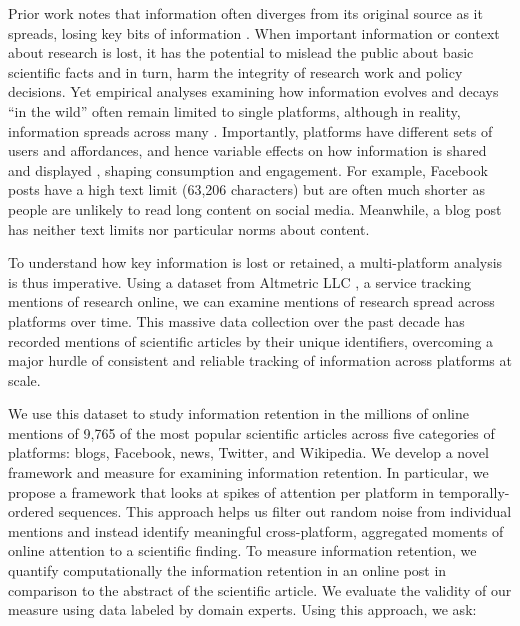 \documentclass[letterpaper]{article} %
\begin{document}
Prior work notes that information often diverges from its original source as it spreads, losing key bits of information \citep{ribeiroMessageDistortionInformation2019,tanLostPropagationUnfolding2016}. When important information or context about research is lost, it has the potential to mislead the public about basic scientific facts and in turn, harm the integrity of research work and policy decisions. Yet empirical analyses examining how information evolves and decays ``in the wild'' often remain limited to single platforms, although in reality, information spreads across many \cite{hillStudyingPopulationsOnline2019,andersonTeensSocialMedia2018}. Importantly, platforms have different sets of users \cite{horvatBirdsFeatherFlock2021} and affordances, and hence variable effects on how information is shared and displayed \cite{malikIdentifyingPlatformEffects2016}, shaping consumption and engagement. For example, Facebook posts have a high text limit (63,206 characters) but are often much shorter as people are unlikely to read long content on social media. Meanwhile, a blog post has neither text limits nor particular norms about content.%

To understand how key information is lost or retained, a multi-platform analysis is thus imperative. %
Using a dataset from Altmetric LLC \citep{altmetricsupportOurDataOur2021}, a service tracking mentions of research online, we can examine mentions of research spread across platforms over time. This massive data collection over the past decade has recorded mentions of scientific articles by their unique identifiers, overcoming a major hurdle of consistent and reliable tracking of information across platforms at scale. %

We use this dataset to study information retention in the millions of online mentions of 9,765 of the most popular scientific articles across five categories of platforms: blogs, Facebook, news, Twitter, and Wikipedia. We develop a novel framework and measure for examining information retention.
In particular, we propose a framework that looks at spikes of attention \cite[aka bursts, see][]{Kleinberg2003,barabasiOriginBurstsHeavy2005,chengCascadesRecur2016} per platform in temporally-ordered sequences. This approach helps us filter out random noise from individual mentions and instead identify meaningful cross-platform, aggregated moments of online attention to a scientific finding.
To measure information retention, we quantify computationally the information retention in an online post in comparison to the abstract of the scientific article. We evaluate the validity of our measure using data labeled by domain experts.
Using this approach, we ask:
\end{document}
